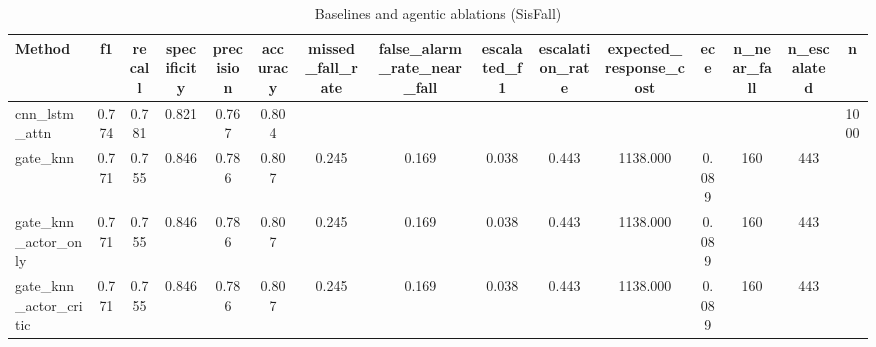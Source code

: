 \begin{table}[t]
\centering
\caption{Baselines and agentic ablations (SisFall)}
\begin{tabular}{lcccccccccccccc}
\toprule
Method & f1 & recall & specificity & precision & accuracy & missed_fall_rate & false_alarm_rate_near_fall & escalated_f1 & escalation_rate & expected_response_cost & ece & n_near_fall & n_escalated & n \\
\midrule
cnn_lstm_attn & 0.774 & 0.781 & 0.821 & 0.767 & 0.804 &  &  &  &  &  &  &  &  & 1000 \\
gate_knn & 0.771 & 0.755 & 0.846 & 0.786 & 0.807 & 0.245 & 0.169 & 0.038 & 0.443 & 1138.000 & 0.089 & 160 & 443 &  \\
gate_knn_actor_only & 0.771 & 0.755 & 0.846 & 0.786 & 0.807 & 0.245 & 0.169 & 0.038 & 0.443 & 1138.000 & 0.089 & 160 & 443 &  \\
gate_knn_actor_critic & 0.771 & 0.755 & 0.846 & 0.786 & 0.807 & 0.245 & 0.169 & 0.038 & 0.443 & 1138.000 & 0.089 & 160 & 443 &  \\
\bottomrule
\end{tabular}
\end{table}